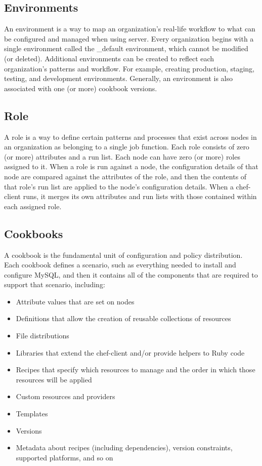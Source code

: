 \subsection{Environments}

An environment is a way to map an organization's real-life workflow to what can be configured and managed when using server. Every organization begins with a single environment called the \_default environment, which cannot be modified (or deleted). Additional environments can be created to reflect each organization’s patterns and workflow. For example, creating production, staging, testing, and development environments. Generally, an environment is also associated with one (or more) cookbook versions.

\subsection{Role}

A role is a way to define certain patterns and processes that exist across nodes in an organization as belonging to a single job function. Each role consists of zero (or more) attributes and a run list. Each node can have zero (or more) roles assigned to it. When a role is run against a node, the configuration details of that node are compared against the attributes of the role, and then the contents of that role’s run list are applied to the node’s configuration details. When a chef-client runs, it merges its own attributes and run lists with those contained within each assigned role.

\subsection{Cookbooks}

A cookbook is the fundamental unit of configuration and policy distribution. Each cookbook defines a scenario, such as everything needed to install and configure MySQL, and then it contains all of the components that are required to support that scenario, including:

\begin{itemize}
  \item Attribute values that are set on nodes
  \item Definitions that allow the creation of reusable collections of resources
  \item File distributions
  \item Libraries that extend the chef-client and/or provide helpers to Ruby code
  \item Recipes that specify which resources to manage and the order in which those resources will be applied
  \item Custom resources and providers
  \item Templates
  \item Versions
  \item Metadata about recipes (including dependencies), version constraints, supported platforms, and so on
\end{itemize}

